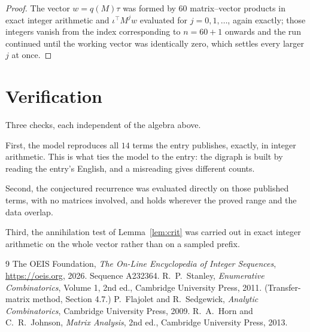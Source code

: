 \documentclass[11pt,a4paper]{article}
\theoremstyle{plain}
\theoremstyle{definition}
\begin{document}
\begin{proof}
The vector $w=q(M)\tau$ was formed by $60$ matrix--vector products in exact integer
arithmetic and $\iota^{\!\top}M^{j}w$ evaluated for $j=0,1,\dots$, again exactly; those
integers vanish from the index corresponding to $n=60+1$ onwards and the run continued
until the working vector was identically zero, which settles every larger $j$ at once.
\end{proof}

\section{Verification}

Three checks, each independent of the algebra above.

First, the model reproduces all $14$ terms the entry publishes, exactly, in integer
arithmetic. This is what ties the model to the entry: the digraph is built by reading the
entry's English, and a misreading gives different counts.

Second, the conjectured recurrence was evaluated directly on those published terms, with no
matrices involved, and holds wherever the proved range and the data overlap.

Third, the annihilation test of Lemma~\ref{lem:crit} was carried out in exact integer
arithmetic on the whole vector rather than on a sampled prefix.

\begin{thebibliography}{9}
 The OEIS Foundation, \emph{The On-Line Encyclopedia of Integer
Sequences}, \url{https://oeis.org}, 2026. Sequence A232364.
 R.~P.~Stanley, \emph{Enumerative Combinatorics}, Volume 1, 2nd ed.,
Cambridge University Press, 2011. (Transfer-matrix method, Section 4.7.)
 P.~Flajolet and R.~Sedgewick, \emph{Analytic Combinatorics}, Cambridge
University Press, 2009.
 R.~A.~Horn and C.~R.~Johnson, \emph{Matrix Analysis}, 2nd ed., Cambridge
University Press, 2013.
\end{thebibliography}
\end{document}
